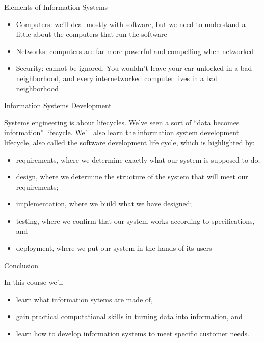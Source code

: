 \documentclass{beamer}
\begin{document}
\begin{frame}{Elements of Information Systems}

\begin{itemize}
\item Computers: we'll deal mostly with software, but we need to
  understand a little about the computers that run the software
\item Networks: computers are far more powerful and compelling when networked
\item Security: cannot be ignored.  You wouldn't leave your car
  unlocked in a bad neighborhood, and every internetworked computer
  lives in a bad neighborhood
\end{itemize}

\end{frame}

\begin{frame}{Information Systems Development}

Systems engineering is about lifecycles.  We've seen a sort of ``data
becomes information'' lifecycle.  We'll also learn the information
system development lifecycle, also called the software development
life cycle, which is highlighted by:
\begin{itemize}
\item requirements, where we determine exactly what our system is
  supposed to do;
\item design, where we determine the structure of the system that will
  meet our requirements;
\item implementation, where we build what we have designed;
\item testing, where we confirm that our system works according to
  specifications, and
\item deployment, where we put our system in the hands of its users
\end{itemize}

\end{frame}

\begin{frame}{Conclusion}

In this course we'll
\begin{itemize}
\item learn what information sytems are made of,
\item gain practical computational skills in turning data into
  information, and
\item learn how to develop information systems to meet specific
  customer needs.
\end{itemize}

\end{frame}
\end{document}
